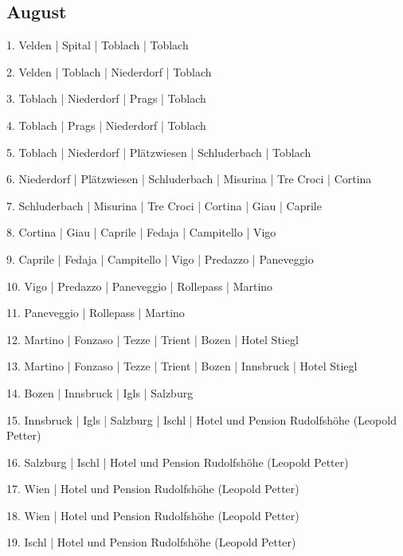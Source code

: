 \documentclass[twoside=false,titlepage=false,open=any, parskip=never, fontsize=10pt, headings=small, chapterprefix=false, appendixprefix=false, DIV=15]{scrbook}
\begin{document}
\begin{multicols}{3}
            \section*{August}
            1. Velden | Spital | Toblach | Toblach\par
            2. Velden | Toblach | Niederdorf | Toblach\par
            3. Toblach | Niederdorf | Prags | Toblach\par
            4. Toblach | Prags | Niederdorf | Toblach\par
            5. Toblach | Niederdorf | Plätzwiesen | Schluderbach | Toblach\par
            6. Niederdorf | Plätzwiesen | Schluderbach | Misurina | Tre Croci | Cortina\par
            7. Schluderbach | Misurina | Tre Croci | Cortina | Giau | Caprile\par
            8. Cortina | Giau | Caprile | Fedaja | Campitello | Vigo\par
            9. Caprile | Fedaja | Campitello | Vigo | Predazzo | Paneveggio\par
            10. Vigo | Predazzo | Paneveggio | Rollepass | Martino\par
            11. Paneveggio | Rollepass | Martino\par
            12. Martino | Fonzaso | Tezze | Trient | Bozen | Hotel Stiegl\par
            13. Martino | Fonzaso | Tezze | Trient | Bozen | Innsbruck | Hotel Stiegl\par
            14. Bozen | Innsbruck | Igls | Salzburg\par
            15. Innsbruck | Igls | Salzburg | Ischl | Hotel und Pension Rudolfshöhe (Leopold Petter)\par
            16. Salzburg | Ischl | Hotel und Pension Rudolfshöhe (Leopold Petter)\par
            17. Wien | Hotel und Pension Rudolfshöhe (Leopold Petter)\par
            18. Wien | Hotel und Pension Rudolfshöhe (Leopold Petter)\par
            19. Ischl | Hotel und Pension Rudolfshöhe (Leopold Petter)\par

\end{multicols}
\end{document}
